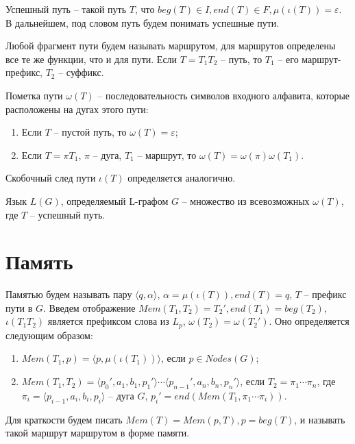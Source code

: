Успешный путь -- такой путь $T$, что $beg(T) \in I, end(T) \in F, \mu(\iota(T)) = \varepsilon$.
В дальнейшем, под словом путь будем понимать успешные пути.

Любой фрагмент пути будем называть маршрутом, для маршрутов определены все те же функции, что и для пути.
Если $T = T_1 T_2$ -- путь, то $T_1$ -- его маршрут-префикс, $T_2$ -- суффикс.

Пометка пути $\omega(T)$ -- последовательность символов входного алфавита, которые расположены на дугах этого пути:
\begin{enumerate}[label=\arabic*)]
    \item Если $T$ -- пустой путь, то $\omega(T) = \varepsilon$;
    \item Если $T = \pi T_1$, $\pi$ -- дуга, $T_1$ -- маршрут, то $\omega(T) = \omega(\pi) \omega(T_1)$.
\end{enumerate}

Скобочный след пути $\iota(T)$ определяется аналогично.

Язык $L(G)$, определяемый L-графом $G$ -- множество из всевозможных $\omega(T)$, где $T$ -- успешный путь.

\section{Память}
Памятью будем называть пару $\langle q, \alpha \rangle$, $\alpha=\mu(\iota(T)), end(T)=q$, $T$ --  префикс пути в $G$. 
Введем отображение $Mem(T_1,T_2) = T_2', end(T_1) = beg(T_2)$, $\iota(T_1 T_2)$ является префиксом слова из $L_p$, $\omega(T_2) = \omega(T_2')$.
Оно определяется следующим образом:
\begin{enumerate}[label=\arabic*)]
    \item $Mem(T_1, p) = \langle p, \mu(\iota(T_1)) \rangle$, если $p \in Nodes(G)$;
    \item {
        $Mem(T_1, T_2) = \langle p_0', a_1, b_1, p_1' \rangle \cdots \langle p_{n-1}', a_n, b_n, p_n' \rangle$, если $T_2 =\pi_1 \cdots \pi_n$, 
        где $\pi_i = \langle p_{i-1}, a_i, b_i, p_i \rangle$ -- дуга $G$, $p_i' = end(Mem(T_1, \pi_1 \cdots \pi_i))$.
    }
\end{enumerate}

Для краткости будем писать $Mem(T) = Mem(p, T), p = beg(T)$, и называть такой маршрут маршрутом в форме памяти. 

